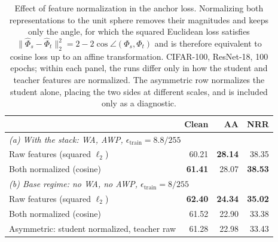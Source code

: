 \begin{table}[!htbp]
  \centering \small \setlength{\tabcolsep}{4.5pt}
  \caption{Effect of feature normalization in the anchor loss. Normalizing both representations to
  the unit sphere removes their magnitudes and keeps only the angle, for which the squared Euclidean
  loss satisfies $\lVert \hat\Phi_s - \hat\Phi_t \rVert_2^2 = 2 - 2\cos\angle(\Phi_s, \Phi_t)$ and is
  therefore equivalent to cosine loss up to an affine transformation. CIFAR-100, ResNet-18, 100
  epochs; within each panel, the runs differ only in how the student and teacher features are
  normalized. The asymmetric row normalizes the student alone, placing the two sides at different
  scales, and is included only as a diagnostic.}
  \label{tab:normalization}
  \begin{tabular}{lrrr}
    \toprule
    & Clean & AA & NRR \\
    \midrule
    \multicolumn{4}{l}{\emph{(a) With the stack: WA, AWP, $\epsilon_{\mathrm{train}} = 8.8/255$}} \\
    Raw features (squared $\ell_2$)            & 60.21 & \textbf{28.14} & 38.35 \\
    Both normalized (cosine)                   & \textbf{61.41} & 28.07 & \textbf{38.53} \\
    \midrule
    \multicolumn{4}{l}{\emph{(b) Base regime: no WA, no AWP, $\epsilon_{\mathrm{train}} = 8/255$}} \\
    Raw features (squared $\ell_2$)            & \textbf{62.40} & \textbf{24.34} & \textbf{35.02} \\
    Both normalized (cosine)                   & 61.52 & 22.90 & 33.38 \\
    Asymmetric: student normalized, teacher raw & 61.28 & 22.98 & 33.43 \\
    \bottomrule
  \end{tabular}
\end{table}

